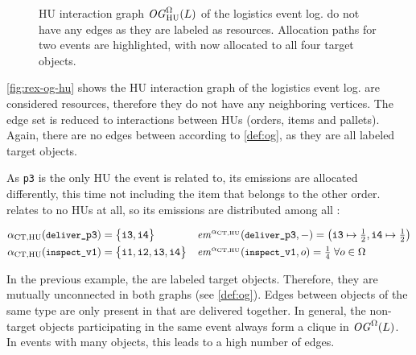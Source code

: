 \begin{figure}[t]
\begin{small}
\begin{center}
    \end{center}
    \caption{HU interaction graph $\mathit{OG}_{\text{HU}}^\Omega(L)$ of the logistics event log.  do not have any edges as they are labeled as resources. Allocation paths for two events are highlighted, with  now allocated to all four target objects.}
    \label{fig:rex-og-hu}
  \end{small}
\end{figure}

\autoref{fig:rex-og-hu} shows the HU interaction graph of the logistics event log.  are considered resources, therefore they do not have any neighboring vertices. The edge set is reduced to interactions between HUs (orders, items and pallets). Again, there are no edges between  according to \cref{def:og}, as they are all labeled target objects.

As \texttt{p3} is the only HU the event  is related to, its emissions are allocated differently, this time not including the item  that belongs to the other order.
 relates to no HUs at all, so its emissions are distributed among all :

\begin{align*}
  \alphaCTHU(\ev{deliver}{p3}) &= \bigl\{ \itm{3},\itm{4} \bigr\} &
  \emAlloc{\alphaCTHU}&(\ev{deliver}{p3},-) = \bigl(
    \itm{3}\mapsto\tfrac{1}{2},
    \itm{4}\mapsto\tfrac{1}{2}
  \bigr)
  \\ %
  \alphaCTHU(\ev{inspect}{v1}) &= \allitms &
  \emAlloc{\alphaCTHU}&(\ev{inspect}{v1},o) = \tfrac{1}{4} \;\forall o\in\Omega
\end{align*}

In the previous example, the  are labeled target objects. Therefore, they are mutually unconnected in both graphs (see \cref{def:og}).
Edges between objects of the same type are only present in  that are delivered together.
In general, the non-target objects participating in the same event always form a clique in $\mathit{OG}^\Omega(L)$. In events with many objects, this leads to a high number of edges.


